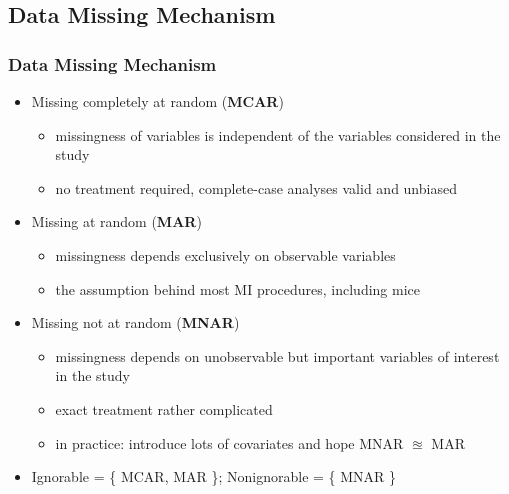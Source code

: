 \documentclass[UKenglish
  pdftex                    %
  dvipsnames                %
]{beamer}
\newcommand{\tmark}{\textcolor{blue}{\ding{51}}}
\newcommand{\pk}[1]{\textcolor{Rblue}{\textsf{#1}}}
\begin{document}
\subsection{Data Missing Mechanism}
\begin{frame}\frametitle{Data Missing Mechanism \small\parencite{rubin:1976}}

\begin{itemize}
  \item Missing completely at random (\textbf{MCAR})
    \begin{itemize}
      \item[\ding{46}] missingness of variables is independent of the variables considered in the study
      \item[\tmark] no treatment required, complete-case analyses valid and unbiased
    \end{itemize}

    \item Missing at random (\textbf{MAR})
  \begin{itemize}
    \item[\ding{46}] missingness depends exclusively on observable variables
    \item[\tmark] the assumption behind most MI procedures, including \pk{mice}
  \end{itemize}

  \item Missing not at random (\textbf{MNAR})
  \begin{itemize}
    \item[\ding{46}] missingness depends on unobservable but important variables of interest in the study
    \item[\tmark] exact treatment rather complicated \parencite{rose:2013}
    \item[\tmark] in practice: introduce lots of covariates and hope MNAR $\approxeq$ MAR
  \end{itemize}

  \item[\ding{108}] Ignorable = \{ MCAR, MAR \}; Nonignorable = \{ MNAR \}
\end{itemize}

\end{frame}
\end{document}
